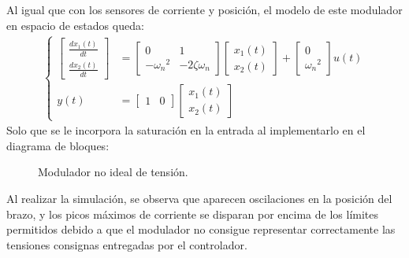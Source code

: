 \documentclass[a4paper, 10pt, onecolumn,journal]{ieeeconf}
\begin{document}
Al igual que con los sensores de corriente y posición, el modelo de este modulador en espacio de estados queda:
\begin{align}
	\begin{cases}
		\begin{bmatrix}
			\frac{d x_1(t)}{dt} \\ 
			\frac{d x_2(t)}{dt}
		\end{bmatrix} &= 
		\begin{bmatrix}
			0 & 1 \\ 
			-{\omega_n}^2 & - 2 \zeta \omega_n
		\end{bmatrix}
		\begin{bmatrix}
			x_1(t) \\ 
			x_2(t)
		\end{bmatrix} + 
		\begin{bmatrix}
			0 \\
			{\omega_n}^2
		\end{bmatrix} u(t) \\
		y(t) &= \begin{bmatrix}
			1 & 0
		\end{bmatrix} 
		\begin{bmatrix}
			x_1(t) \\ 
			x_2(t)
		\end{bmatrix}
	\end{cases}\label{ecuacion matricial de modulador de tension real}
\end{align}
Solo que se le incorpora la saturación en la entrada al implementarlo en el diagrama de bloques:
\begin{figure}[H]
	\centering
	\begin{adjustbox}{scale=0.5,max width=\columnwidth}
	\end{adjustbox}
	\caption{Modulador no ideal de tensión.}
	\label{Modulador no ideal de tensión}
\end{figure}
Al realizar la simulación, se observa que aparecen oscilaciones en la posición  del brazo, y los picos máximos de corriente se disparan por encima de los límites permitidos debido a que el modulador no consigue representar correctamente las tensiones consignas entregadas por el controlador.
\end{document}
